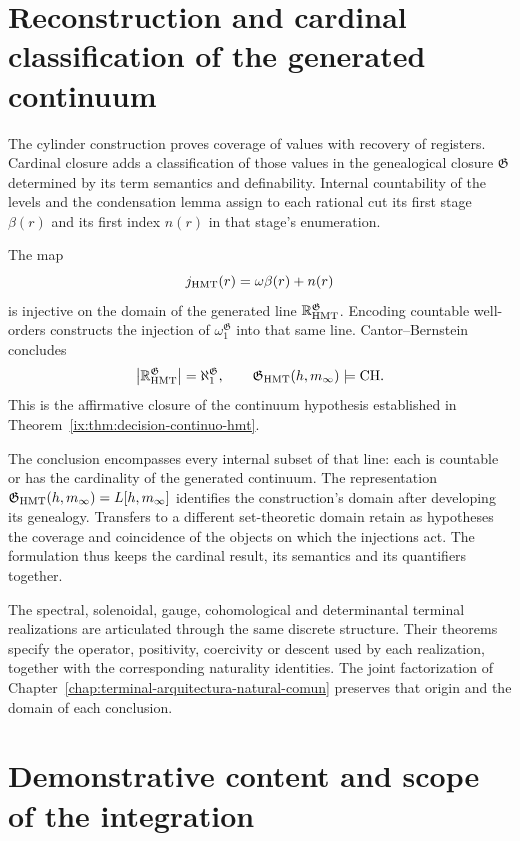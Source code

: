\section{Reconstruction and cardinal classification of the generated continuum}

The cylinder construction proves coverage of values with recovery of registers. Cardinal closure adds a classification of those values in the genealogical closure \(\mathfrak G\) determined by its term semantics and definability. Internal countability of the levels and the condensation lemma assign to each rational cut its first stage \(\beta(r)\) and its first index \(n(r)\) in that stage's enumeration.

The map
\[
 j_{\rm HMT}(r)=\omega\beta(r)+n(r)
\]
is injective on the domain of the generated line \(\mathbb R_{\rm HMT}^{\mathfrak G}\). Encoding countable well-orders constructs the injection of \(\omega_1^{\mathfrak G}\) into that same line. Cantor--Bernstein concludes
\[
 \left|\mathbb R_{\rm HMT}^{\mathfrak G}\right|
 =\aleph_1^{\mathfrak G},
 \qquad
 \mathfrak G_{\rm HMT}(h,m_\infty)
 \models\mathrm{CH}.
\]
This is the affirmative closure of the continuum hypothesis established in Theorem~\ref{ix:thm:decision-continuo-hmt}.

The conclusion encompasses every internal subset of that line: each is countable or has the cardinality of the generated continuum. The representation \(\mathfrak G_{\rm HMT}(h,m_\infty)=L[h,m_\infty]\) identifies the construction's domain after developing its genealogy. Transfers to a different set-theoretic domain retain as hypotheses the coverage and coincidence of the objects on which the injections act. The formulation thus keeps the cardinal result, its semantics and its quantifiers together.

The spectral, solenoidal, gauge, cohomological and determinantal terminal realizations are articulated through the same discrete structure. Their theorems specify the operator, positivity, coercivity or descent used by each realization, together with the corresponding naturality identities. The joint factorization of Chapter~\ref{chap:terminal-arquitectura-natural-comun} preserves that origin and the domain of each conclusion.

\section{Demonstrative content and scope of the integration}


